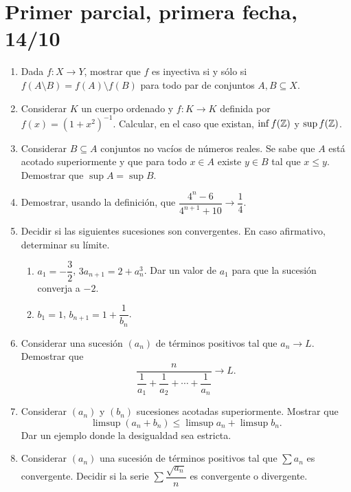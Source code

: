 \section{Primer parcial, primera fecha, 14/10}

\begin{enumerate}[label=(\arabic*)]
  \item Dada \(f\colon X \to Y\), mostrar que \(f\) es inyectiva si y sólo si \(f(A \setminus B) = f(A) \setminus f(B)\) para todo par de conjuntos \(A, B \subseteq X\).
  \item Considerar \(K\) un cuerpo ordenado y \(f\colon K \to K\) definida por \(f(x) = {(1 + x^2)}^{-1}\). Calcular, en el caso que existan, \(\inf f(\mathbb{Z})\) y \(\sup f(\mathbb{Z})\).
  \item Considerar \(B \subseteq A\) conjuntos no vacíos de números reales. Se sabe que \(A\) está acotado superiormente y que para todo \(x \in A\) existe \(y \in B\) tal que \(x \leq y\). Demostrar que \(\sup A = \sup B\).
  \item Demostrar, usando la definición, que \(\dfrac{4^n - 6}{4^{n+1} + 10} \to \dfrac{1}{4}\).
  \item Decidir si las siguientes sucesiones son convergentes. En caso afirmativo, determinar su límite.
        \begin{enumerate}[label=(\alph*)]
          \item \(a_1 = -\dfrac{3}{2}\), \(3 a_{n+1} = 2 + a_n^3\). Dar un valor de \(a_1\) para que la sucesión converja a \(-2\).
          \item \(b_1 = 1\), \(b_{n+1} = 1 + \dfrac{1}{b_n}\).
        \end{enumerate}
  \item Considerar una sucesión \({(a_n)}\) de términos positivos tal que \(a_n \to L\). Demostrar que
        \[
          \dfrac{n}{\dfrac{1}{a_1} + \dfrac{1}{a_2} + \cdots + \dfrac{1}{a_n}} \to L.
        \]
  \item Considerar \({(a_n)}\) y \({(b_n)}\) sucesiones acotadas superiormente. Mostrar que
        \[
          \limsup (a_n + b_n) \leq \limsup a_n + \limsup b_n.
        \]
        Dar un ejemplo donde la desigualdad sea estricta.
  \item Considerar \({(a_n)}\) una sucesión de términos positivos tal que \(\sum a_n\) es convergente. Decidir si la serie \(\sum \dfrac{\sqrt{a_n}}{n}\) es convergente o divergente.
\end{enumerate}

\clearpage

